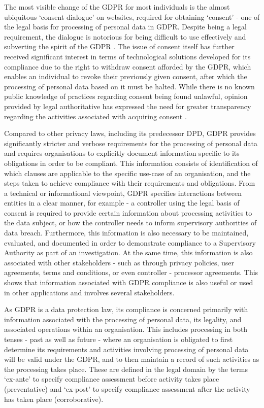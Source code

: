 The most visible change of the GDPR for most individuals is the almost ubiquitous `consent dialogue' on websites, required for obtaining `consent' - one of the legal basis for processing of personal data in GDPR.
Despite being a legal requirement, the dialogue is notorious for being difficult to use effectively and subverting the spirit of the GDPR \cite{machuletz_multiple_2019,utz_informed_2019}.
The issue of consent itself has further received significant interest in terms of technological solutions developed for its compliance due to the right to withdraw consent afforded by the GDPR, which enables an individual to revoke their previously given consent, after which the processing of personal data based on it must be halted.
While there is no known public knowledge of practices regarding consent being found unlawful, opinion provided by legal authoritative has expressed the need for greater transparency regarding the activities associated with acquiring consent \cite{noauthor_opinion_2019}.

Compared to other privacy laws, including its predecessor DPD, GDPR provides significantly stricter and verbose requirements for the processing of personal data and requires organisations to explicitly document information specific to its obligations in order to be compliant.
This information consists of identification of which clauses are applicable to the specific use-case of an organisation, and the steps taken to achieve compliance with their requirements and obligations.
From a technical or informational viewpoint, GDPR specifies interactions between entities in a clear manner, for example - a controller using the legal basis of consent is required to provide certain information about processing activities to the data subject, or how the controller needs to inform supervisory authorities of data breach. Furthermore, this information is also necessary to be maintained, evaluated, and documented in order to demonstrate compliance to a Supervisory Authority as part of an investigation. At the same time, this information is also associated with other stakeholders - such as through privacy policies, user agreements, terms and conditions, or even controller - processor agreements. This shows that information associated with GDPR compliance is also useful or used in other applications and involves several stakeholders.

As GDPR is a data protection law, its compliance is concerned primarily with information associated with the processing of personal data, its legality, and associated operations within an organisation. 
This includes processing in both tenses - past as well as future - where an organisation is obligated to first determine its requirements and activities involving processing of personal data will be valid under the GDPR, and to then maintain a record of such activities as the processing takes place.
These are defined in the legal domain by the terms `ex-ante' to specify compliance assessment before activity takes place (preventative) and `ex-post' to specify compliance assessment after the activity has taken place (corroborative).

